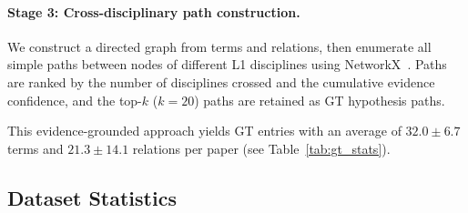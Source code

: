 \documentclass{article}
\begin{document}
\paragraph{Stage 3: Cross-disciplinary path construction.}
We construct a directed graph from terms and relations, then enumerate all simple paths between nodes of different L1 disciplines using NetworkX~\cite{hagberg2008exploring}.
Paths are ranked by the number of disciplines crossed and the cumulative evidence confidence, and the top-$k$ ($k=20$) paths are retained as GT hypothesis paths.

This evidence-grounded approach yields GT entries with an average of $32.0 \pm 6.7$ terms and $21.3 \pm 14.1$ relations per paper (see Table~\ref{tab:gt_stats}).

\subsection{Dataset Statistics}
\label{sec:stats}
\end{document}
